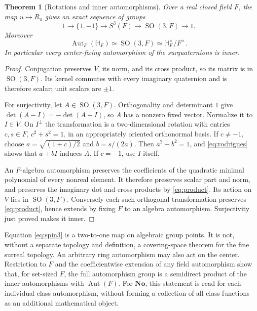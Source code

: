 \documentclass[11pt,letterpaper]{article}
\numberwithin{equation}{section}
\newtheorem{theorem}{Theorem}[section]
\theoremstyle{definition}
\theoremstyle{remark}
\newcommand{\No}{\mathbf{No}}
\newcommand{\HF}{\mathbb H_F}
\newcommand{\Aut}{\operatorname{Aut}}
\newcommand{\SO}{\operatorname{SO}}
\begin{document}
\begin{theorem}[Rotations and inner automorphisms]\label{thm:rotations}
Over a real closed field $F$, the map $u\mapsto R_u$ gives an exact sequence of groups
\begin{equation}\label{eq:spin3}
 1\longrightarrow\{1,-1\}\longrightarrow S^3(F)
 \longrightarrow\SO(3,F)\longrightarrow1.
\end{equation}
Moreover
\[
 \Aut_F(\HF)\simeq\SO(3,F)\simeq\HF^\times/F^\times.
\]
In particular every center-fixing automorphism of the surquaternions is inner.
\end{theorem}
\begin{proof}
Conjugation preserves $V$, its norm, and its cross product, so its matrix is in $\SO(3,F)$.
Its kernel commutes with every imaginary quaternion and is therefore scalar; unit scalars are
$\pm1$.

For surjectivity, let $A\in\SO(3,F)$. Orthogonality and determinant $1$ give
$\det(A-I)=-\det(A-I)$, so $A$ has a nonzero fixed vector. Normalize it to $I\in V$.
On $I^\perp$ the transformation is a two-dimensional rotation with entries $c,s\in F$,
$c^2+s^2=1$, in an appropriately oriented orthonormal basis. If $c\ne-1$, choose
$a=\sqrt{(1+c)/2}$ and $b=s/(2a)$. Then $a^2+b^2=1$, and \eqref{eq:rodrigues} shows that
$a+bI$ induces $A$. If $c=-1$, use $I$ itself.

An $F$-algebra automorphism preserves the coefficients of the quadratic minimal polynomial
of every nonreal element. It therefore preserves scalar part and norm, and preserves the
imaginary dot and cross products by \eqref{eq:product}. Its action on $V$ lies in $\SO(3,F)$.
Conversely each such orthogonal transformation preserves \eqref{eq:product}, hence extends
by fixing $F$ to an algebra automorphism. Surjectivity just proved makes it inner.
\end{proof}

Equation \eqref{eq:spin3} is a two-to-one map on algebraic group points. It is not, without a
separate topology and definition, a covering-space theorem for the fine surreal topology.
An arbitrary ring automorphism may also act on the center. Restriction to $F$ and the
coefficientwise extension of any field automorphism show that, for set-sized $F$, the full
automorphism group is a semidirect product of the inner automorphisms with $\Aut(F)$.
For $\No$, this statement is read for each individual class automorphism, without forming
a collection of all class functions as an additional mathematical object.
\end{document}
